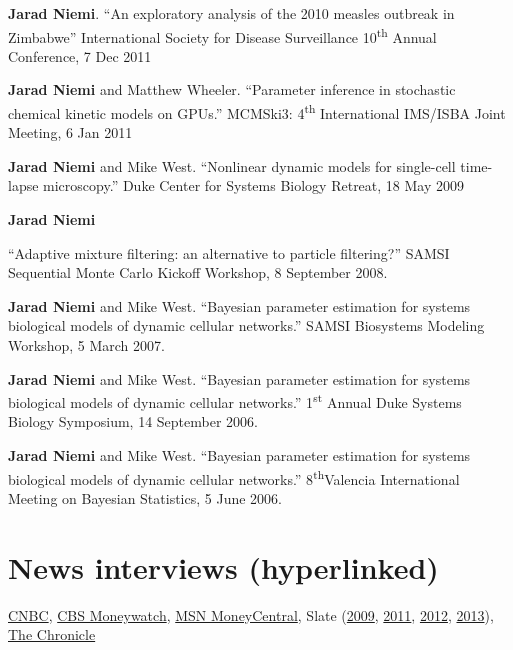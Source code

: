 \documentclass[overlapped,line]{res}
\begin{document}
\begin{resume}
{{\bf Jarad Niemi}. ``An exploratory analysis of the 2010 measles outbreak in Zimbabwe'' International Society for Disease Surveillance 10\textsuperscript{th} Annual Conference, 7 Dec 2011 

{\bf Jarad Niemi} and Matthew Wheeler. ``Parameter inference in stochastic chemical kinetic models on GPUs.'' MCMSki3: 4\textsuperscript{th} International IMS/ISBA Joint Meeting, 6 Jan 2011

{\bf Jarad Niemi} and Mike West. ``Nonlinear dynamic models for single-cell time-lapse microscopy.'' Duke Center for Systems Biology Retreat, 18 May 2009


\newpage\opening 

{\bf Jarad Niemi} ``Adaptive mixture filtering: an alternative to particle filtering?'' SAMSI Sequential Monte Carlo Kickoff Workshop, 8 September 2008.

{\bf Jarad Niemi} and Mike West. ``Bayesian parameter estimation for systems biological models of dynamic cellular networks.'' SAMSI Biosystems Modeling Workshop, 5 March 2007.



{\bf Jarad Niemi} and Mike West. ``Bayesian parameter estimation for systems biological models of dynamic cellular networks.'' 1\textsuperscript{st} Annual Duke Systems Biology Symposium, 14 September 2006.

{\bf Jarad Niemi} and Mike West. ``Bayesian parameter estimation for systems biological models of dynamic cellular networks.'' 8\textsuperscript{th}Valencia International Meeting on Bayesian Statistics, 5 June 2006.

}



\section{\bf News interviews (hyperlinked)}

\href{http://www.nbcnews.com/business/slam-dunk-your-rivals-office-march-madness-pool-1C8912546}{CNBC}, %
\href{http://moneywatch.bnet.com/economic-news/article/ncaa-brackets-how-to-win-your-march-madness-pool/403055/?tag=main;related-link-0}{CBS Moneywatch}, 
\href{http://articles.moneycentral.msn.com/SmartSpending/blog/page.aspx?post=1704157}{MSN MoneyCentral}, 
Slate (\href{http://www.slate.com/id/2213974/pagenum/all/}{2009}, \href{http://www.slate.com/id/2288234/pagenum/all/}{2011}, 
\href{http://www.slate.com/articles/sports/sports_nut/2012/03/ncaa_basketball_tournament_bracket_act_like_a_hedge_fund_manager_and_pick_ohio_state_to_win_it_all_.single.html}{2012}, 
\href{http://www.slate.com/articles/sports/sports_nut/2012/03/ncaa_basketball_tournament_bracket_act_like_a_hedge_fund_manager_and_pick_ohio_state_to_win_it_all_.single.html}{2013}),
\href{http://dukechronicle.com/node/145805}{The Chronicle}





\end{resume}
\end{document}
